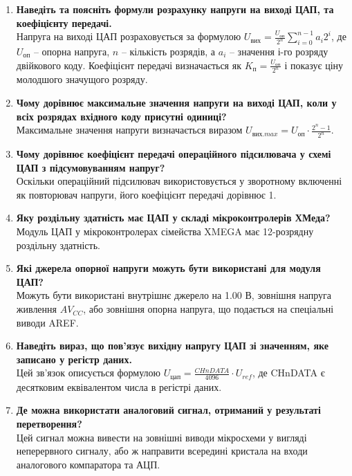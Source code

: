 \documentclass[14pt, a4paper]{extreport}
\begin{document}
	\begin{enumerate}
		\item \textbf{Наведіть та поясніть формули розрахунку напруги на виході ЦАП, та коефіцієнту передачі.} \\ Напруга на виході ЦАП розраховується за формулою $U_{вих} = \frac{U_{оп}}{2^n} \sum_{i=0}^{n-1} a_i 2^i$, де $U_{оп}$ -- опорна напруга, $n$ -- кількість розрядів, а $a_i$ -- значення і-го розряду двійкового коду. Коефіцієнт передачі визначається як $K_{п} = \frac{U_{оп}}{2^n}$ і показує ціну молодшого значущого розряду.
		
		\item \textbf{Чому дорівнює максимальне значення напруги на виході ЦАП, коли у всіх розрядах вхідного коду присутні одиниці?} \\ Максимальне значення напруги визначається виразом $U_{вих.max} = U_{оп} \cdot \frac{2^n - 1}{2^n}$.
		
		\item \textbf{Чому дорівнює коефіцієнт передачі операційного підсилювача у схемі ЦАП з підсумовуванням напруг?} \\ Оскільки операційний підсилювач використовується у зворотному включенні як повторювач напруги, його коефіцієнт передачі дорівнює 1.
		
		\item \textbf{Яку роздільну здатність має ЦАП у складі мікроконтролерів ХМеда?} \\ Модуль ЦАП у мікроконтролерах сімейства XMEGA має 12-розрядну роздільну здатність.
		
		\item \textbf{Які джерела опорної напруги можуть бути використані для модуля ЦАП?} \\ Можуть бути використані внутрішнє джерело на 1.00 В, зовнішня напруга живлення $AV_{CC}$, або зовнішня опорна напруга, що подається на спеціальні виводи AREF.
		
		\item \textbf{Наведіть вираз, що пов'язує вихідну напругу ЦАП зі значенням, яке записано у регістр даних.} \\ Цей зв'язок описується формулою $U_{цап} = \frac{CHnDATA}{4096} \cdot U_{ref}$, де CHnDATA є десятковим еквівалентом числа в регістрі даних.
		
		\item \textbf{Де можна використати аналоговий сигнал, отриманий у результаті перетворення?} \\ Цей сигнал можна вивести на зовнішні виводи мікросхеми у вигляді неперервного сигналу, або ж направити всередині кристала на входи аналогового компаратора та АЦП.
		

\end{enumerate}
\end{document}

